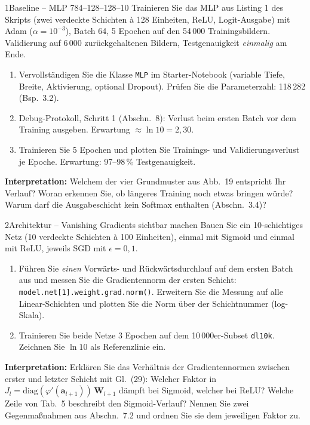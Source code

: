 \documentclass[11pt,a4paper]{article}
\newcommand{\code}[1]{\texttt{#1}}
\begin{document}
\begin{aufgabe}{1}{Baseline -- MLP 784--128--128--10}
Trainieren Sie das MLP aus Listing 1 des Skripts (zwei verdeckte Schichten à 128 Einheiten, ReLU, Logit-Ausgabe) mit Adam ($\alpha = 10^{-3}$), Batch 64, 5 Epochen auf den 54\,000 Trainingsbildern. Validierung auf 6\,000 zurückgehaltenen Bildern, Testgenauigkeit \emph{einmalig} am Ende.
\begin{enumerate}
  \item Vervollständigen Sie die Klasse \code{MLP} im Starter-Notebook (variable Tiefe, Breite, Aktivierung, optional Dropout). Prüfen Sie die Parameterzahl: 118\,282 (Bsp.\ 3.2).
  \item Debug-Protokoll, Schritt 1 (Abschn.\ 8): Verlust beim ersten Batch vor dem Training ausgeben. Erwartung $\approx \ln 10 = 2{,}30$.
  \item Trainieren Sie 5 Epochen und plotten Sie Trainings- und Validierungsverlust je Epoche. Erwartung: 97--98\,\% Testgenauigkeit.
\end{enumerate}
\begin{leitfragen}\small
\textbf{Interpretation:} Welchem der vier Grundmuster aus Abb.\ 19 entspricht Ihr Verlauf? Woran erkennen Sie, ob längeres Training noch etwas bringen würde? Warum darf die Ausgabeschicht kein Softmax enthalten (Abschn.\ 3.4)?
\end{leitfragen}
\end{aufgabe}

\begin{aufgabe}{2}{Architektur -- Vanishing Gradients sichtbar machen}
Bauen Sie ein 10-schichtiges Netz (10 verdeckte Schichten à 100 Einheiten), einmal mit Sigmoid und einmal mit ReLU, jeweils SGD mit $\epsilon = 0{,}1$.
\begin{enumerate}
  \item Führen Sie \emph{einen} Vorwärts- und Rückwärtsdurchlauf auf dem ersten Batch aus und messen Sie die Gradientennorm der ersten Schicht: \code{model.net[1].weight.grad.norm()}. Erweitern Sie die Messung auf alle Linear-Schichten und plotten Sie die Norm über der Schichtnummer (log-Skala).
  \item Trainieren Sie beide Netze 3 Epochen auf dem 10\,000er-Subset \code{dl10k}. Zeichnen Sie $\ln 10$ als Referenzlinie ein.
\end{enumerate}
\begin{leitfragen}\small
\textbf{Interpretation:} Erklären Sie das Verhältnis der Gradientennormen zwischen erster und letzter Schicht mit Gl.\ (29): Welcher Faktor in $J_l = \mathrm{diag}(\varphi'(\boldsymbol a_{l+1}))\,\boldsymbol W_{l+1}$ dämpft bei Sigmoid, welcher bei ReLU? Welche Zeile von Tab.\ 5 beschreibt den Sigmoid-Verlauf? Nennen Sie zwei Gegenmaßnahmen aus Abschn.\ 7.2 und ordnen Sie sie dem jeweiligen Faktor zu.
\end{leitfragen}
\end{aufgabe}
\end{document}
